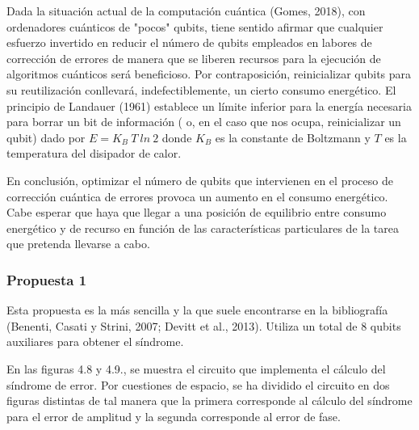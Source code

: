 Dada la situación actual de la computación cuántica (Gomes, 2018), con ordenadores cuánticos de "pocos" qubits, tiene sentido afirmar que cualquier esfuerzo invertido en reducir el número de qubits empleados en labores de corrección de errores de manera que se liberen recursos para la ejecución de algoritmos cuánticos será beneficioso. Por contraposición, reinicializar qubits para su reutilización conllevará, indefectiblemente, un cierto consumo energético. El principio de Landauer (1961) establece un límite inferior para la energía necesaria para borrar un bit de información ( o, en el caso que nos ocupa, reinicializar un qubit) dado por $ E= K_B \ T \ ln \ 2 $ donde $K_B$ es la constante de Boltzmann y $T$ es la temperatura del disipador de calor.

En conclusión, optimizar el número de qubits que intervienen en el proceso de corrección cuántica de errores provoca un aumento en el consumo energético. Cabe esperar que haya que llegar a una posición de equilibrio entre consumo energético y de recurso en función de las características particulares de la tarea que pretenda llevarse a cabo.

\subsubsection{Propuesta 1}

Esta propuesta es la más sencilla y la que suele encontrarse en la bibliografía (Benenti, Casati y Strini, 2007; Devitt et al., 2013). Utiliza un total de 8 qubits auxiliares para obtener el síndrome. 

En las figuras 4.8 y 4.9., se muestra el circuito que implementa el cálculo del síndrome de error. Por cuestiones de espacio, se ha dividido el circuito en dos figuras distintas de tal manera que la primera corresponde al cálculo del síndrome para el error de amplitud y la segunda corresponde al error de fase. 

